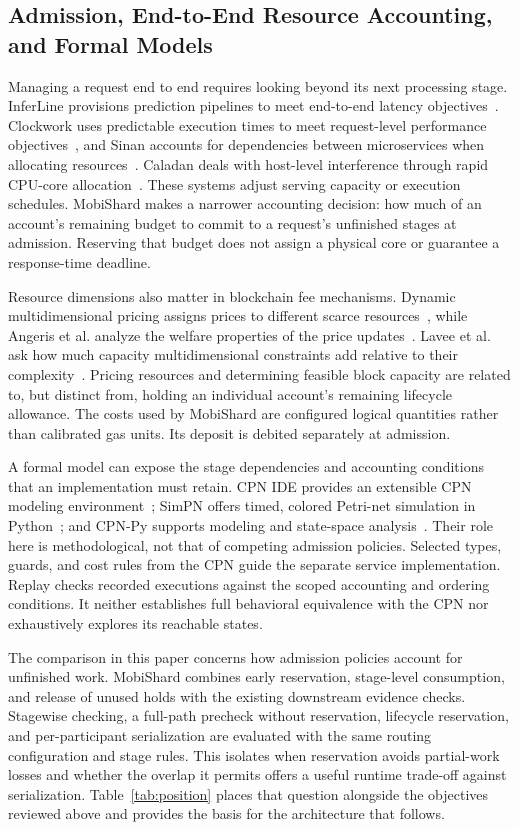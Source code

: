 \subsection{Admission, End-to-End Resource Accounting, and Formal Models}

Managing a request end to end requires looking beyond its next processing
stage. InferLine provisions prediction pipelines to meet end-to-end latency
objectives~\cite{inferline}. Clockwork uses predictable execution times to
meet request-level performance objectives~\cite{clockwork}, and Sinan accounts
for dependencies between microservices when allocating resources~\cite{sinan}.
Caladan deals with host-level interference through rapid CPU-core
allocation~\cite{caladan}. These systems adjust serving capacity or execution
schedules. MobiShard makes a narrower accounting decision: how much of an
account's remaining budget to commit to a request's unfinished stages at
admission. Reserving that budget does not assign a physical core or guarantee a
response-time deadline.

Resource dimensions also matter in blockchain fee mechanisms. Dynamic
multidimensional pricing assigns prices to different scarce
resources~\cite{dynamicfees}, while Angeris et al. analyze the welfare
properties of the price updates~\cite{optimalfees}. Lavee et al. ask how much
capacity multidimensional constraints add relative to their
complexity~\cite{needfees}. Pricing resources and determining feasible block
capacity are related to, but distinct from, holding an individual account's
remaining lifecycle allowance. The costs used by MobiShard are configured
logical quantities rather than calibrated gas units. Its deposit is debited
separately at admission.

A formal model can expose the stage dependencies and accounting conditions
that an implementation must retain. CPN IDE provides an extensible CPN
modeling environment~\cite{cpnide}; SimPN offers timed, colored Petri-net
simulation in Python~\cite{simpn}; and CPN-Py supports modeling and state-space
analysis~\cite{cpnpy}. Their role here is methodological, not that of competing
admission policies. Selected types, guards, and cost rules from the CPN guide
the separate service implementation. Replay checks recorded executions against
the scoped accounting and ordering conditions. It neither establishes full
behavioral equivalence with the CPN nor exhaustively explores its reachable
states.

The comparison in this paper concerns how admission policies account for
unfinished work. MobiShard combines early reservation, stage-level consumption,
and release of unused holds with the existing downstream evidence checks.
Stagewise checking, a full-path precheck without reservation, lifecycle
reservation, and per-participant serialization are evaluated with the same
routing configuration and stage rules. This isolates when reservation avoids
partial-work losses and whether the overlap it permits offers a useful
runtime trade-off against serialization. Table~\ref{tab:position} places that
question alongside the objectives reviewed above and provides the basis for
the architecture that follows.

